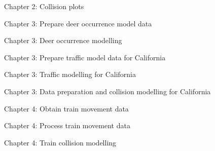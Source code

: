 %

\vspace{.5cm}
\noindent Chapter 2: Collision plots

%


\vspace{.5cm}
\noindent Chapter 3: Prepare deer occurrence model data

%

\vspace{.5cm}
\noindent Chapter 3: Deer occurrence modelling

%

\vspace{.5cm}
\noindent Chapter 3: Prepare traffic model data for California

%

\vspace{.5cm}
\noindent Chapter 3: Traffic modelling for California

%

\vspace{.5cm}
\noindent Chapter 3: Data preparation and collision modelling for California

%


\vspace{.5cm}
\noindent Chapter 4: Obtain train movement data

%

\vspace{.5cm}
\noindent Chapter 4: Process train movement data

%

\vspace{.5cm}
\noindent Chapter 4: Train collision modelling

